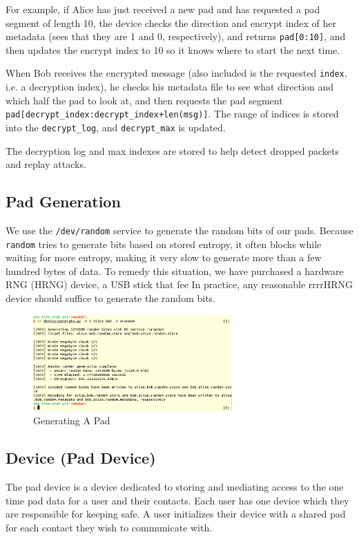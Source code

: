 \documentclass[twocolumn]{article}
\begin{document}
For example, if Alice has just received a new pad and has requested a pad segment of length 10, the device checks the direction and encrypt index of her metadata (sees that they are 1 and 0, respectively), and returns \texttt{pad[0:10]}, and then updates the encrypt index to 10 so it knows where to start the next time.

When Bob receives the encrypted message (also included is the requested \texttt{index}, i.e. a decryption index), he checks his metadata file to see what direction and which half the pad to look at, and then requests the pad segment \texttt{pad[decrypt\_index:decrypt\_index+len(msg)]}. The range of indices is stored into the \texttt{decrypt\_log}, and \texttt{decrypt\_max} is updated.

The decryption log and max indexes are stored to help detect dropped packets and replay attacks.

\subsection{Pad Generation}
\label{sec:padgen}
We use the \texttt{/dev/random} service to generate the random bits of our pads. Because \texttt{random} tries to generate bits based on stored entropy, it often blocks while waiting for more entropy, making it very slow to generate more than a few hundred bytes of data. To remedy this situation, we have purchased a hardware RNG (HRNG) device, a USB stick that fee
In practice, any reasonable rrrrHRNG device should suffice to generate the random bits.
\begin{figure}[htp]
\centering
\includegraphics[width=3in]{generate}
\caption{Generating A Pad}
\end{figure}


\subsection{Device (Pad Device)}
The pad device is a device dedicated to storing and mediating access to the one time pad data for a user and their contacts. Each user has one device which they are responsible for keeping safe. A user initializes their device with a shared pad for each contact they wish to communicate with.
\end{document}
